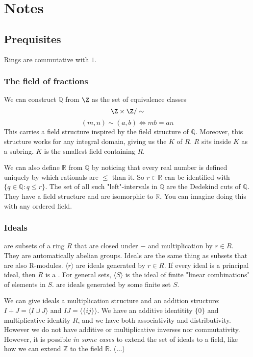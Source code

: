 \section{Notes}
\subsection{Prequisites}
Rings are commutative with $1$.
\subsubsection{The field of fractions}
We can construct $\mathbb{Q}$ from $\Z$ as the set of equivalence classes $$\Z\times\Z / \sim $$
$$(m,n)\sim (a,b)\iff mb=an$$
This carries a field structure inspired by the field structure of $\mathbb{Q}$. Moreover, this structure works for any integral domain, giving us the  $K$ of $R$. $R$ sits inside $K$ as a subring. $K$ is the smallest field containing $R$.

We can also define $\mathbb{R}$ from $\mathbb{Q}$ by noticing that every real number is defined uniquely by which rationals are $\leq$ than it. So $r\in \mathbb{R}$ can be identified with $\{q\in \mathbb{Q}:q\leq r\}$. The set of all such "left"-intervals in $\mathbb{Q}$ are the Dedekind cuts of $\mathbb{Q}$. They have a field structure and are isomorphic to $\mathbb{R}$. You can imagine doing this with any ordered field.

\subsubsection{Ideals}
 are subsets of a ring $R$ that are closed under $-$ and multiplication by $r\in R$. They are automatically abelian groups. Ideals are the same thing as subsets that are also R-modules.  $\langle r \rangle$ are ideals generated by $r\in R$. If every ideal is a principal ideal, then $R$ is a . For general sets, $\langle S \rangle$ is the ideal of finite "linear combinations" of elements in $S$.  are ideals generated by some finite set $S$.

We can give ideals a multiplication structure and an addition structure: $I+ J=\langle I\cup J\rangle$ and $IJ=\langle \{ij\} \rangle$. We have an additive identitity $\{0\}$ and multiplicative identity $R$, and we have both associativity and distributivity. However we do not have additive or multiplicative inverses nor commutativity. However, it is possible \textit{in some cases} to extend the set of ideals to a field,  like how we can extend $\mathbb{Z}$ to the field $\mathbb{R}$. (...)

